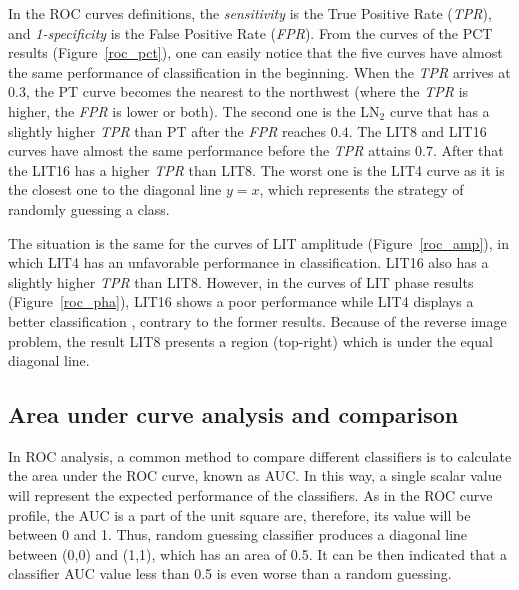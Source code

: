 
In the ROC curves definitions, the \textit{sensitivity} is the True Positive Rate (\textit{TPR}), and \textit{1-specificity} is the False Positive Rate (\textit{FPR}).
From the curves of the PCT results (Figure~\ref{roc_pct}), one can easily notice that the five curves have almost the same performance of classification in the beginning. When the \textit{TPR} arrives at $0.3$, the PT curve becomes the nearest to the northwest (where the \textit{TPR} is higher, the \textit{FPR} is lower or both). The second one is the LN$_2$ curve that has a slightly higher \textit{TPR} than PT after the \textit{FPR} reaches $0.4$. The LIT8 and LIT16 curves have almost the same performance before the \textit{TPR} attains $0.7$. After that the LIT16 has a higher \textit{TPR} than LIT8. The worst one is the LIT4 curve as it is the closest one to the diagonal line $y=x$, which represents the strategy of randomly guessing a class.

The situation is the same for the curves of LIT amplitude (Figure~\ref{roc_amp}), in which LIT4 has an unfavorable performance in classification. LIT16 also has a slightly higher \textit{TPR} than LIT8. However, in the curves of LIT phase results (Figure~\ref{roc_pha}), LIT16 shows a poor performance while LIT4 displays a better classification
, contrary to the former results. 
Because of the reverse image problem, the result LIT8 presents a region (top-right) which is under the equal diagonal line.


\subsection{Area under curve analysis and comparison}
In ROC analysis, a common method to compare different classifiers is to calculate the area under the ROC curve, known as AUC.\citet{Fawcett2006} In this way, a single scalar value will represent the expected performance of the classifiers. As in the ROC curve profile, the AUC is a part of the unit square are, therefore, its value will be between 0 and 1. Thus, random guessing classifier produces a diagonal line between (0,0) and (1,1), which has an area of 0.5. It can be then indicated that a classifier AUC value less than 0.5 is even worse than a random guessing. 


